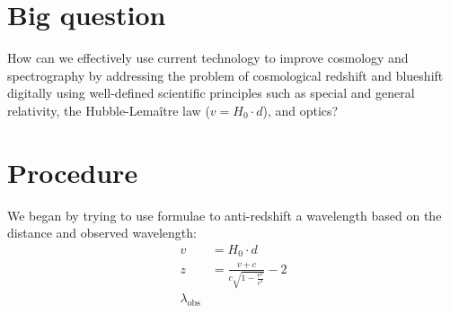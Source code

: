 \documentclass[a4paper, 17pt]{extarticle}
\begin{document}
\section{Big question}
How can we effectively use current technology to improve cosmology and spectrography by addressing the problem of cosmological redshift and blueshift digitally using well-defined scientific principles such as special and general relativity, the Hubble-Lemaître law (\(v = H_0 \cdot d\)), and optics?

\section{Procedure}
We began by trying to use formulae to anti-redshift a wavelength based on the distance and observed wavelength:
\begin{align}
    v &= H_0 \cdot d \\
    z &= \frac{v + c}{c\sqrt{1 - \frac{v^2}{c^2}}} - 2\\
    \lambda_{\text{obs}}
\end{align}
\end{document}
